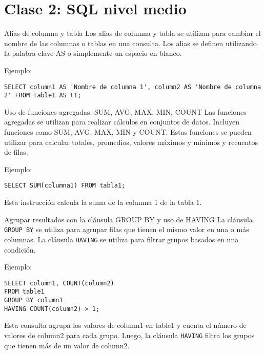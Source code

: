 \hypertarget{clase-2-sql-nivel-medio}{%
\section{Clase 2: SQL nivel medio}\label{clase-2-sql-nivel-medio}}

\begin{frame}[fragile]{Alias de columna y tabla}
\protect\hypertarget{alias-de-columna-y-tabla}{}
Los alias de columna y tabla se utilizan para cambiar el nombre de las
columnas o tablas en una consulta. Los alias se definen utilizando la
palabra clave AS o simplemente un espacio en blanco.

Ejemplo:

\begin{verbatim}
SELECT column1 AS 'Nombre de columna 1', column2 AS 'Nombre de columna 2' FROM table1 AS t1;
\end{verbatim}
\end{frame}

\begin{frame}[fragile]{Uso de funciones agregadas: SUM, AVG, MAX, MIN,
COUNT}
\protect\hypertarget{uso-de-funciones-agregadas-sum-avg-max-min-count}{}
Las funciones agregadas se utilizan para realizar cálculos en conjuntos
de datos. Incluyen funciones como SUM, AVG, MAX, MIN y COUNT. Estas
funciones se pueden utilizar para calcular totales, promedios, valores
máximos y mínimos y recuentos de filas.

Ejemplo:

\begin{verbatim}
SELECT SUM(columna1) FROM tabla1;
\end{verbatim}

Esta instrucción calcula la suma de la columna 1 de la tabla 1.
\end{frame}

\begin{frame}[fragile]{Agrupar resultados con la cláusula GROUP BY y uso
de HAVING}
\protect\hypertarget{agrupar-resultados-con-la-cluxe1usula-group-by-y-uso-de-having}{}
La cláusula \texttt{GROUP\ BY} se utiliza para agrupar filas que tienen
el mismo valor en una o más columnas. La cláusula \texttt{HAVING} se
utiliza para filtrar grupos basados en una condición.

Ejemplo:

\begin{verbatim}
SELECT column1, COUNT(column2) 
FROM table1 
GROUP BY column1 
HAVING COUNT(column2) > 1;
\end{verbatim}

Esta consulta agrupa los valores de column1 en table1 y cuenta el número
de valores de column2 para cada grupo. Luego, la cláusula
\texttt{HAVING} filtra los grupos que tienen más de un valor de column2.
\end{frame}

